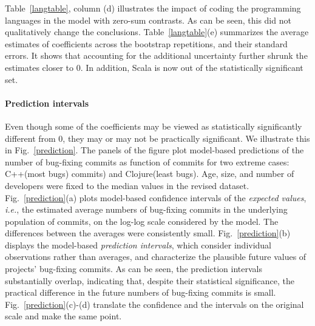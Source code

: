 \documentclass[acmsmall]{acmart}
\newcommand{\cpp}{{\sf  C++}\xspace}
\newcommand{\scala}{{\sf  Scala}\xspace}
\newcommand{\clojure}{{\sf  Clojure}\xspace}
\newcommand{\ie}{\emph{i.e.}\xspace}
\begin{document}
Table~\ref{langtable}, column (d) illustrates the impact of coding the
programming languages in the model with zero-sum contrasts. As can be seen,
this did not qualitatively change the conclusions.  Table~\ref{langtable}(e)
summarizes the average estimates of coefficients across the bootstrap
repetitions, and their standard errors. It shows that accounting for the
additional uncertainty further shrunk the estimates closer to 0. In
addition, \scala is now out of the statistically significant set.

\paragraph{Prediction intervals}
Even though some of the coefficients may be viewed as statistically
significantly different from 0, they may or may not be practically
significant. We illustrate this in Fig.~\ref{prediction}. The panels of the
figure plot model-based predictions of the number of bug-fixing commits as
function of commits for two extreme cases: \cpp (most bugs) commits) and
\clojure (least bugs).  Age, size, and number of developers were fixed to
the median values in the revised dataset. Fig.~\ref{prediction}(a) plots
model-based confidence intervals of the {\it expected values}, \ie, the
estimated average numbers of bug-fixing commits in the underlying population
of commits, on the log-log scale considered by the model. The differences
between the averages were consistently small. Fig.~\ref{prediction}(b)
displays the model-based {\it prediction intervals}, which consider
individual observations rather than averages, and characterize the plausible
future values of projects' bug-fixing commits. As can be seen, the
prediction intervals substantially overlap, indicating that, despite their
statistical significance, the practical difference in the future numbers of
bug-fixing commits is small. Fig.~\ref{prediction}(c)-(d) translate the
confidence and the intervals on the original scale and make the same point.
\end{document}
